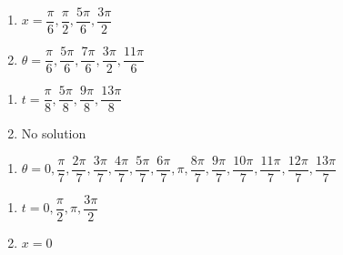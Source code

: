\documentclass{ximera}
\begin{document}
\begin{multicols}{2}

\begin{enumerate}

\setcounter{enumi}{\value{HW}}

\item $x = \dfrac{\pi}{6}, \dfrac{\pi}{2}, \dfrac{5\pi}{6}, \dfrac{3\pi}{2}$
\item $\theta = \dfrac{\pi}{6}, \dfrac{5\pi}{6}, \dfrac{7\pi}{6}, \dfrac{3\pi}{2}, \dfrac{11\pi}{6}$

\setcounter{HW}{\value{enumi}}

\end{enumerate}

\end{multicols}

\begin{multicols}{2}

\begin{enumerate}

\setcounter{enumi}{\value{HW}}

\item $t = \dfrac{\pi}{8}, \dfrac{5\pi}{8}, \dfrac{9\pi}{8}, \dfrac{13\pi}{8}$
\item No solution 

\setcounter{HW}{\value{enumi}}

\end{enumerate}

\end{multicols}

\begin{enumerate}

\setcounter{enumi}{\value{HW}}

\item $\theta = 0, \dfrac{\pi}{7}, \dfrac{2\pi}{7}, \dfrac{3\pi}{7}, \dfrac{4\pi}{7}, \dfrac{5\pi}{7}, \dfrac{6\pi}{7}, \pi, \dfrac{8\pi}{7}, \dfrac{9\pi}{7}, \dfrac{10\pi}{7}, \dfrac{11\pi}{7}, \dfrac{12\pi}{7}, \dfrac{13\pi}{7}$

\setcounter{HW}{\value{enumi}}

\end{enumerate}

\begin{multicols}{2}

\begin{enumerate}

\setcounter{enumi}{\value{HW}}

\item  $t=0, \dfrac{\pi}{2}, \pi, \dfrac{3\pi}{2}$

\item $x = 0$ 

\setcounter{HW}{\value{enumi}}

\end{enumerate}

\end{multicols}
\end{document}

